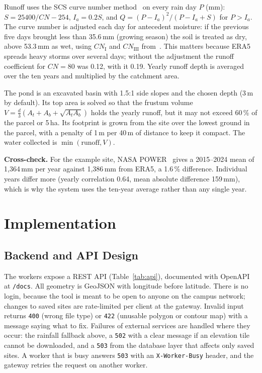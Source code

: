 \documentclass[manuscript,screen,review]{acmart}
\begin{document}
Runoff uses the SCS curve number method~\cite{scs1972neh4} on every rain day $P$ (mm):
$S = 25400/\mathit{CN} - 254$, $I_a = 0.2S$, and $Q = (P-I_a)^2/(P-I_a+S)$ for $P>I_a$. The curve
number is adjusted each day for antecedent moisture: if the previous five days brought less than
35.6\,mm (growing season) the soil is treated as dry, above 53.3\,mm as wet, using
$\mathit{CN}_\mathrm{I}$ and $\mathit{CN}_\mathrm{III}$ from~\cite{chow1988applied}. This matters
because ERA5 spreads heavy storms over several days; without the adjustment the runoff
coefficient for $\mathit{CN}=80$ was 0.12, with it 0.19. Yearly runoff depth is averaged over the
ten years and multiplied by the catchment area.

The pond is an excavated basin with 1.5:1 side slopes and the chosen depth (3\,m by default). Its
top area is solved so that the frustum volume $V=\tfrac{d}{3}(A_t+A_b+\sqrt{A_tA_b})$ holds the
yearly runoff, but it may not exceed 60\,\% of the parcel or 5\,ha. Its footprint is grown from the
site over the lowest ground in the parcel, with a penalty of 1\,m per 40\,m of distance to keep it
compact. The water collected is $\min(\text{runoff}, V)$.

\textbf{Cross-check.} For the example site, NASA POWER~\cite{nasapower} gives a 2015--2024 mean
of 1{,}364\,mm per year against 1{,}386\,mm from ERA5, a 1.6\,\% difference. Individual years
differ more (yearly correlation 0.64, mean absolute difference 159\,mm), which is why the system
uses the ten-year average rather than any single year.

\section{Implementation}
\label{sec:implementation}

\subsection{Backend and API Design}
The workers expose a REST API (Table~\ref{tab:api}), documented with OpenAPI at \texttt{/docs}.
All geometry is GeoJSON with longitude before latitude. There is no login, because the tool is
meant to be open to anyone on the campus network; changes to saved sites are rate-limited per
client at the gateway. Invalid input returns \texttt{400} (wrong file type) or \texttt{422}
(unusable polygon or contour map) with a message saying what to fix. Failures of external
services are handled where they occur: the rainfall fallback above, a \texttt{502} with a clear
message if an elevation tile cannot be downloaded, and a \texttt{503} from the database layer that
affects only saved sites. A worker that is busy answers \texttt{503} with an
\texttt{X-Worker-Busy} header, and the gateway retries the request on another worker.
\end{document}
